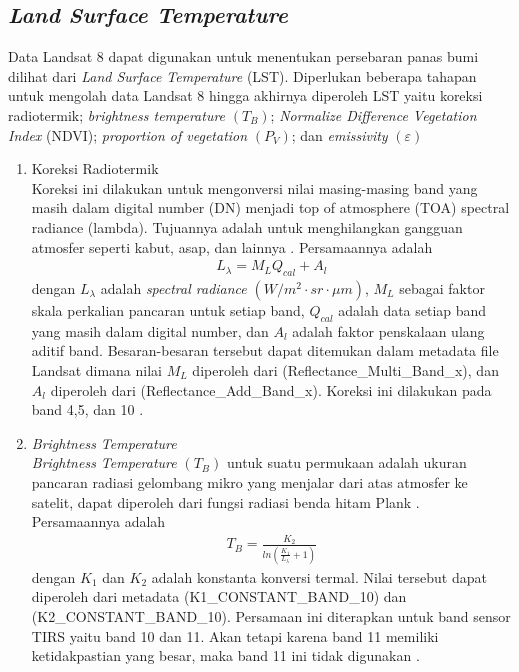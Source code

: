 \subsection{\textit{Land Surface Temperature}}
Data Landsat 8 dapat digunakan untuk menentukan persebaran panas bumi dilihat dari \textit{Land Surface Temperature }(LST). Diperlukan beberapa tahapan untuk mengolah data Landsat 8 hingga akhirnya diperoleh LST yaitu koreksi radiotermik; \textit{brightness temperature} $(T_B)$; \textit{Normalize Difference Vegetation Index} (NDVI); \textit{proportion of vegetation} $(P_V)$; dan \textit{emissivity} $(\varepsilon)$
\begin{enumerate}
	\item Koreksi Radiotermik\\
	Koreksi ini dilakukan untuk mengonversi nilai masing-masing band yang masih dalam digital number (DN) menjadi top of atmosphere (TOA) spectral radiance (lambda). Tujuannya adalah untuk menghilangkan gangguan atmosfer seperti kabut, asap, dan lainnya \citep{USGS2019}. Persamaannya adalah
	\begin{align}
		L_{\lambda}=M_LQ_{cal}+A_l
	\end{align}
	dengan $L_{\lambda}$ adalah \textit{spectral radiance} $(W/m^{2}\cdot sr\cdot\mu m)$, $M_L$ sebagai faktor skala perkalian pancaran untuk setiap band, $Q_{cal}$ adalah data setiap band yang masih dalam digital number, dan $A_l$ adalah faktor penskalaan ulang aditif band. Besaran-besaran tersebut dapat ditemukan dalam metadata file Landsat dimana nilai $M_L$ diperoleh dari (Reflectance\_Multi\_Band\_x), dan $A_l$ diperoleh dari (Reflectance\_Add\_Band\_x). Koreksi ini dilakukan pada band 4,5, dan 10 \citep{USGS2019}.
	\vskip 5pt
	\item \textit{Brightness Temperature} \\
	\textit{Brightness Temperature} $(T_B)$ untuk suatu permukaan adalah ukuran pancaran radiasi gelombang mikro yang menjalar dari atas atmosfer ke satelit, dapat diperoleh dari fungsi radiasi benda hitam Plank \citep{USGS2019}. Persamaannya adalah
	\begin{align}
		T_B = \frac{K_2}{ln\left ( \frac{K_1}{L_{\lambda}}+1 \right )}
	\end{align}
	dengan $K_1$ dan $K_2$ adalah konstanta konversi termal. Nilai tersebut dapat diperoleh dari metadata (K1\_CONSTANT\_BAND\_10) dan (K2\_CONSTANT\_BAND\_10). Persamaan ini diterapkan untuk band sensor TIRS yaitu band 10 dan 11. Akan tetapi karena band 11 memiliki ketidakpastian yang besar, maka band 11 ini tidak digunakan \citep{AvdanandJovanovska}.

\end{enumerate}
